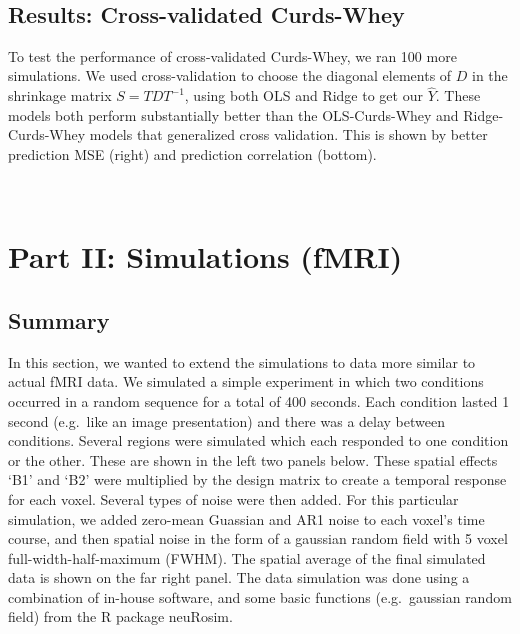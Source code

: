 \documentclass{article}
\begin{document}
    \begin{center}
    \end{center}
    { \hspace*{\fill} \\}
    
    
   \subsection{Results: Cross-validated Curds-Whey}\label{}
 
 To test the performance of cross-validated Curds-Whey, we ran 100 more simulations. We used cross-validation to choose the diagonal elements of $D$ in the shrinkage matrix $S=TDT^{-1}$, using both OLS and Ridge to get our $ \hat Y$. These models both perform substantially better than the OLS-Curds-Whey and Ridge-Curds-Whey models that generalized cross validation. This is shown by better prediction MSE (right) and prediction correlation (bottom). 
 
     
        \begin{center}
    \end{center}
    { \hspace*{\fill} \\}
    
    
    
    
    
    \section{Part II: Simulations (fMRI)}\label{part-ii-simulations-fmri}

\subsection{Summary}

In this section, we wanted to extend the simulations to data more
similar to actual fMRI data. We simulated a simple experiment in which two
conditions occurred in a random sequence for a total of 400 seconds.
Each condition lasted 1 second (e.g.~like an image presentation) and
there was a delay between conditions. Several regions were simulated
which each responded to one condition or the other. These are shown in
the left two panels below. These spatial effects `B1' and `B2' were
multiplied by the design matrix to create a temporal response for each
voxel. Several types of noise were then added. For this particular
simulation, we added zero-mean Guassian and AR1 noise to each voxel's
time course, and then spatial noise in the form of a gaussian random
field with 5 voxel full-width-half-maximum (FWHM). The spatial average of the final simulated data
is shown on the far right panel. The data simulation was done using a
combination of in-house software, and some basic functions
(e.g.~gaussian random field) from the R package neuRosim.
\end{document}
